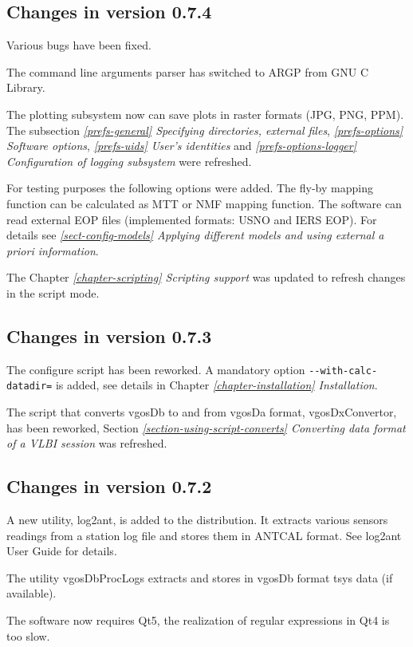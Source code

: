 \documentclass [10pt,letterpaper]{report}
\begin{document}
{\subsection{Changes in version 0.7.4}

Various bugs have been fixed.

The command line arguments parser has switched to ARGP from GNU C Library.

The plotting subsystem now can save plots in raster formats (JPG, PNG, PPM).
The subsection
\emph{\ref{prefs-general} Specifying directories, external files},
\emph{\ref{prefs-options} Software options},
\emph{\ref{prefs-uids} User's identities} and 
\emph{\ref{prefs-options-logger} Configuration of logging subsystem}
were refreshed.

For testing purposes the following options were added. The fly-by mapping
function can be calculated as MTT or NMF mapping function. The software can
read external EOP files (implemented formats: USNO and IERS EOP). For details
see \emph{\ref{sect-config-models} Applying different models and using external
a priori information}.

The Chapter
\emph{\ref{chapter-scripting} Scripting support}
was updated to refresh changes in the script mode.


\subsection{Changes in version 0.7.3}
The configure script has been reworked. A mandatory option {\tt -{}-with-calc-datadir=}
is added, see details in Chapter \emph{\ref{chapter-installation} Installation}.

The script that converts vgosDb to and from vgosDa format, vgosDxConvertor, has
been reworked, Section
\emph{\ref{section-using-script-converts} Converting data format of a VLBI session}
was refreshed.

\subsection{Changes in version 0.7.2}

A new utility, log2ant, is added to the distribution. It extracts various sensors
readings from a station log file and stores them in ANTCAL format. See log2ant User
Guide for details.

The utility vgosDbProcLogs extracts and stores in vgosDb format tsys data (if
available).

The software now requires Qt5, the realization of regular expressions in Qt4 is too slow.

}
\end{document}
